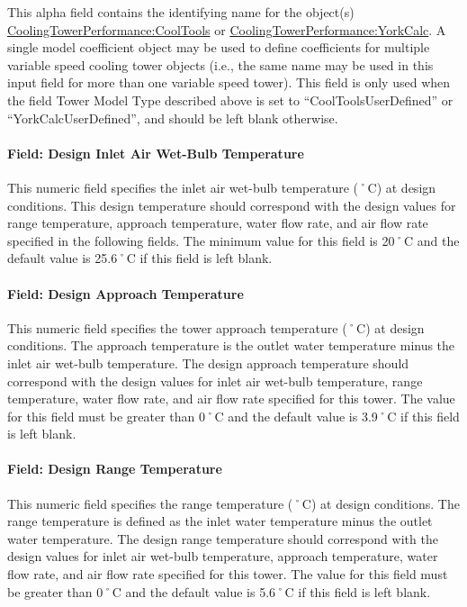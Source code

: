 This alpha field contains the identifying name for the object(s) \hyperref[coolingtowerperformancecooltools]{CoolingTowerPerformance:CoolTools} or \hyperref[coolingtowerperformanceyorkcalc]{CoolingTowerPerformance:YorkCalc}. A single model coefficient object may be used to define coefficients for multiple variable speed cooling tower objects (i.e., the same name may be used in this input field for more than one variable speed tower). This field is only used when the field Tower Model Type described above is set to ``CoolToolsUserDefined'' or ``YorkCalcUserDefined'', and should be left blank otherwise.

\paragraph{Field: Design Inlet Air Wet-Bulb Temperature}\label{field-design-inlet-air-wet-bulb-temperature}

This numeric field specifies the inlet air wet-bulb temperature (˚C) at design conditions. This design temperature should correspond with the design values for range temperature, approach temperature, water flow rate, and air flow rate specified in the following fields. The minimum value for this field is 20˚C and the default value is 25.6˚C if this field is left blank.

\paragraph{Field: Design Approach Temperature}\label{field-design-approach-temperature}

This numeric field specifies the tower approach temperature (˚C) at design conditions. The approach temperature is the outlet water temperature minus the inlet air wet-bulb temperature. The design approach temperature should correspond with the design values for inlet air wet-bulb temperature, range temperature, water flow rate, and air flow rate specified for this tower. The value for this field must be greater than 0˚C and the default value is 3.9˚C if this field is left blank.

\paragraph{Field: Design Range Temperature}\label{field-design-range-temperature}

This numeric field specifies the range temperature (˚C) at design conditions. The range temperature is defined as the inlet water temperature minus the outlet water temperature. The design range temperature should correspond with the design values for inlet air wet-bulb temperature, approach temperature, water flow rate, and air flow rate specified for this tower. The value for this field must be greater than 0˚C and the default value is 5.6˚C if this field is left blank.

